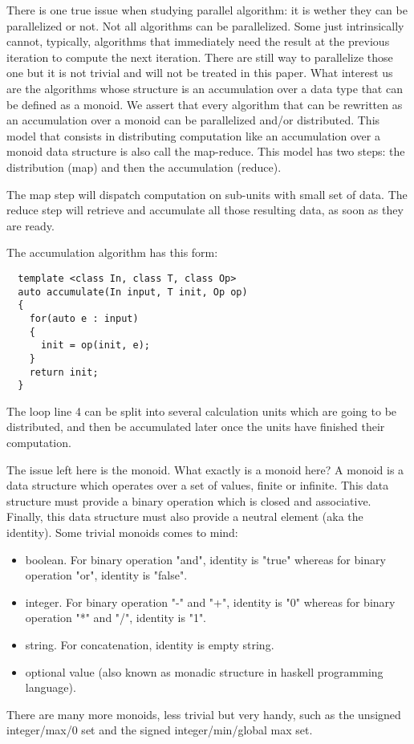 There is one true issue when studying parallel algorithm: it is wether they can be parallelized or not. Not all
algorithms can be parallelized. Some just intrinsically cannot, typically, algorithms that immediately need the result
at the previous iteration to compute the next iteration. There are still way to parallelize those one but it is not
trivial and will not be treated in this paper. What interest us are the algorithms whose structure is an accumulation
over a data type that can be defined as a monoid. We assert that every algorithm that can be rewritten as an
accumulation over a monoid can be parallelized and/or distributed. This model that consists in distributing computation
like an accumulation over a monoid data structure is also call the map-reduce. This model has two steps: the
distribution (map) and then the accumulation (reduce).

The map step will dispatch computation on sub-units with small set of data. The reduce step will retrieve and accumulate
all those resulting data, as soon as they are ready.

The accumulation algorithm has this form:
\begin{verbatim}
  template <class In, class T, class Op>
  auto accumulate(In input, T init, Op op)
  {
    for(auto e : input)
    {
      init = op(init, e);
    }
    return init;
  }
\end{verbatim}

The loop line 4 can be split into several calculation units which are going to be distributed, and then be accumulated
later once the units have finished their computation.

The issue left here is the monoid. What exactly is a monoid here? A monoid is a data structure which operates over a set
of values, finite or infinite. This data structure must provide a binary operation which is closed and associative.
Finally, this data structure must also provide a neutral element (aka the identity). Some trivial monoids comes to mind:
\begin{itemize}
  \item boolean. For binary operation "and", identity is "true" whereas for binary operation "or", identity is "false".
  \item integer. For binary operation "-" and "+", identity is "0" whereas for binary operation "*" and "/", identity is
        "1".
  \item string. For concatenation, identity is empty string.
  \item optional value (also known as monadic structure in haskell programming language).
\end{itemize}
There are many more monoids, less trivial but very handy, such as the unsigned integer/max/0 set and the signed
integer/min/global max set.

